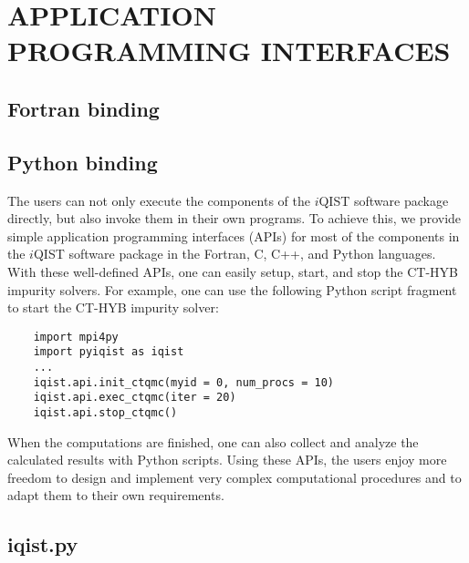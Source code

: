 \chapter{APPLICATION PROGRAMMING INTERFACES}
\section{Fortran binding}
\section{Python binding}
The users can not only execute the components of the $i$QIST software package directly, but also invoke them in their own programs. To achieve this, we provide simple application programming interfaces (APIs) for most of the components in the $i$QIST software package in the Fortran, C, C++, and Python languages. With these well-defined APIs, one can easily setup, start, and stop the CT-HYB impurity solvers. For example, one can use the following Python script fragment to start the CT-HYB impurity solver:
\begin{verbatim}
    import mpi4py
    import pyiqist as iqist
    ...
    iqist.api.init_ctqmc(myid = 0, num_procs = 10)
    iqist.api.exec_ctqmc(iter = 20)
    iqist.api.stop_ctqmc()
\end{verbatim}
When the computations are finished, one can also collect and analyze the calculated results with Python scripts. Using these APIs, the users enjoy more freedom to design and implement very complex computational procedures and to adapt them to their own requirements.

\section{iqist.py}
